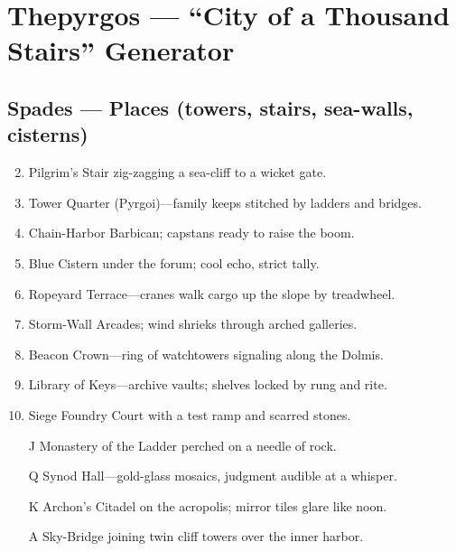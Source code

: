 \chapter{Thepyrgos --- ``City of a Thousand Stairs'' Generator}

\section*{Spades --- Places (towers, stairs, sea-walls, cisterns)}
\begin{enumerate}
\setcounter{enumi}{1}
\item Pilgrim's Stair zig-zagging a sea-cliff to a wicket gate.
\item Tower Quarter (Pyrgoi)---family keeps stitched by ladders and bridges.
\item Chain-Harbor Barbican; capstans ready to raise the boom.
\item Blue Cistern under the forum; cool echo, strict tally.
\item Ropeyard Terrace---cranes walk cargo up the slope by treadwheel.
\item Storm-Wall Arcades; wind shrieks through arched galleries.
\item Beacon Crown---ring of watchtowers signaling along the Dolmis.
\item Library of Keys---archive vaults; shelves locked by rung and rite.
\item Siege Foundry Court with a test ramp and scarred stones.
\item[J] Monastery of the Ladder perched on a needle of rock.
\item[Q] Synod Hall---gold-glass mosaics, judgment audible at a whisper.
\item[K] Archon's Citadel on the acropolis; mirror tiles glare like noon.
\item[A] Sky-Bridge joining twin cliff towers over the inner harbor.
\end{enumerate}

